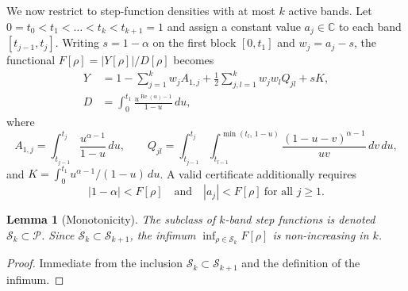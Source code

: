 \documentclass[11pt]{article}
\theoremstyle{plain}
\newtheorem{lem}[thm]{Lemma}
\DeclareMathOperator{\Repart}{Re}
\begin{document}
We now restrict to step-function densities with at most $k$ active bands.  Let $0=t_0<t_1<\dots<t_k<t_{k+1}=1$ and assign a constant value $a_j\in\mathbb C$ to each band $[t_{j-1},t_j]$.  Writing $s=1-\alpha$ on the first block $[0,t_1]$ and $w_j=a_j-s$, the functional $F[\rho]=|Y[\rho]|/D[\rho]$ becomes
\begin{align}
Y &= 1-\sum_{j=1}^k w_j A_{1,j}+\frac12\sum_{j,l=1}^k w_j w_l Q_{jl}+sK,\label{eq:Y-kband}\\
D &= \int_0^{t_1}\frac{u^{\Repart(\alpha)-1}}{1-u}\,du,
\end{align}
where
\[
A_{1,j}=\int_{t_{j-1}}^{t_j}\frac{u^{\alpha-1}}{1-u}\,du,
\qquad
Q_{jl}=\int_{t_{j-1}}^{t_j}\!\int_{t_{l-1}}^{\min(t_l,\,1-u)}
\frac{(1-u-v)^{\alpha-1}}{uv}\,dv\,du,
\]
and $K=\int_0^{t_1}u^{\alpha-1}/(1-u)\,du$.
A valid certificate additionally requires
\[
|1-\alpha|<F[\rho]\quad\text{and}\quad |a_j|<F[\rho]\ \text{for all }j\ge1.
\]

\begin{lem}[Monotonicity]\label{lem:monotone}
The subclass of $k$-band step functions is denoted $\mathcal S_k\subset\mathcal P$.  Since $\mathcal S_k\subset\mathcal S_{k+1}$, the infimum $\inf_{\rho\in\mathcal S_k}F[\rho]$ is non-increasing in $k$.
\end{lem}
\begin{proof}
Immediate from the inclusion $\mathcal S_k\subset\mathcal S_{k+1}$ and the definition of the infimum.
\end{proof}
\end{document}
